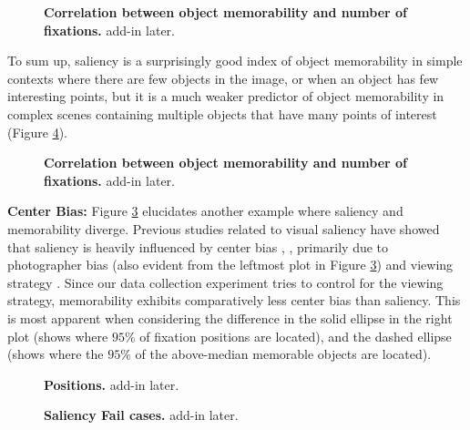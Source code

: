 \begin{figure}[t]
\centering
{}
\vspace{-5mm}\caption{\footnotesize\textbf{Correlation between object memorability and number of fixations.} add-in later. }\label{fig:fixCorr}
\end{figure}

To sum up, saliency is a surprisingly good index of object memorability in simple contexts where there are few objects in the image, or when an object has few interesting points, but it is a much weaker predictor of object memorability in complex scenes containing multiple objects that have many points of interest (Figure \ref{fig:fixQual}).

\begin{figure}[b]
\centering
{}
\vspace{-5mm}\caption{\footnotesize\textbf{Correlation between object memorability and number of fixations.} add-in later. }\label{fig:scatterFixation}
\end{figure}

\textbf{Center Bias: } Figure \ref{fig:fixPos} elucidates another example where saliency and memorability diverge. Previous studies related to visual saliency have showed that saliency is heavily influenced by center bias \cite{judd09}, \cite{sun08}, primarily due to photographer bias (also evident from the leftmost plot in Figure \ref{fig:fixPos}) and viewing strategy \cite{tseng2009}. Since our data collection experiment tries to control for the viewing strategy, memorability exhibits comparatively less center bias than saliency. This is most apparent when considering the difference in the solid ellipse in the right plot (shows where $95\%$ of fixation positions are located), and the dashed ellipse (shows where the $95\%$ of the above-median memorable objects are located).


\begin{figure}[t]
\centering
{}
\vspace{-5mm}\caption{\footnotesize\textbf{Positions.} add-in later. }\label{fig:fixPos}
\end{figure}

\begin{figure}[t]
\centering
{}
\vspace{-5mm}\caption{\footnotesize\textbf{Saliency Fail cases.} add-in later. }\label{fig:fixQual}
\end{figure}


